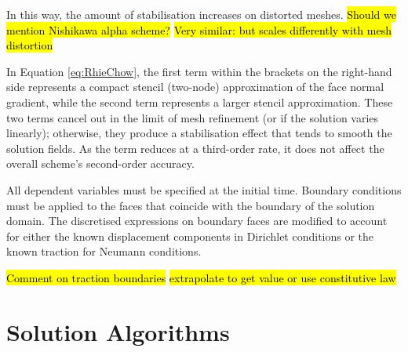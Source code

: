 \documentclass[sn-mathphys,Numbered,draft]{sn-jnl}%
\newcommand{\bb}{\boldsymbol}
\begin{document}
In this way, the amount of stabilisation increases on distorted meshes.
\hl{Should we mention Nishikawa alpha scheme?} \hl{Very similar: but scales differently with mesh distortion}

In Equation \ref{eq:RhieChow}, the first term within the brackets on the right-hand side represents a compact stencil (two-node) approximation of the face normal gradient, while the second term represents a larger stencil approximation.
These two terms cancel out in the limit of mesh refinement (or if the solution varies linearly); otherwise, they produce a stabilisation effect that tends to smooth the solution fields.
As the term reduces at a third-order rate, it does not affect the overall scheme's second-order accuracy.

All dependent variables must be specified at the initial time.
Boundary conditions must be applied to the faces that coincide with the boundary of the solution domain.
The discretised expressions on boundary faces are modified to account for either the known displacement components in Dirichlet conditions or the known traction for Neumann conditions.



\hl{Comment on traction boundaries} \hl{extrapolate to get value or use constitutive law}



\section{Solution Algorithms}\label{sec:sol_alg}


\end{document}
